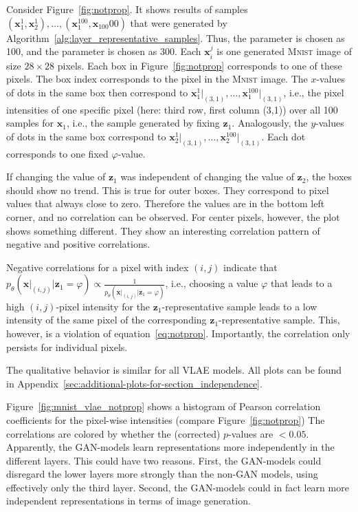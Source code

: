 Consider Figure~\ref{fig:notprop}.
It shows results of samples $(\bm{x}_1^1,\bm{x}_2^1),\dots,(\bm{x}_1^{100},\bm{x}_{100}00)$ that were generated by Algorithm~\ref{alg:layer_representative_samples}.
Thus, the parameter  is chosen as 100, and the parameter  is chosen as 300.
Each $\bm{x}_i^j$ is one generated \textsc{Mnist} image of size $28\times 28$ pixels.
Each box in Figure~\ref{fig:notprop} corresponds to one of these pixels.
The box index corresponds to the pixel in the \textsc{Mnist} image.
The $x$-values of dots in the same box then correspond to $\bm{x}_1^1\big|_{(3,1)}, \dots, \bm{x}_1^{100}\big|_{(3,1)}$, i.e., the pixel intensities of one specific pixel (here: third row, first column (3,1)) over all 100 samples for $\bm{x}_1$, i.e., the sample generated by fixing $\bm{z}_1$.
Analogously, the $y$-values of dots in the same box correspond to $\bm{x}_2^1\big|_{(3,1)}, \dots, \bm{x}_2^{100}\big|_{(3,1)}$.
Each dot corresponds to one fixed $\varphi$-value.

If changing the value of $\bm{z}_1$ was independent of changing the value of $\bm{z}_2$, the boxes should show no trend.
This is true for outer boxes.
They correspond to pixel values that always close to zero.
Therefore the values are in the bottom left corner, and no correlation can be observed.
For center pixels, however, the plot shows something different.
They show an interesting correlation pattern of negative and positive correlations.

Negative correlations for a pixel with index $(i,j)$ indicate that $p_\theta(\bm{x}\big|_{(i,j)} | \bm{z}_1 = \varphi) \propto \frac{1}{p_\theta(\bm{x}\big|_{(i,j)} | \bm{z}_1 = \varphi)}$, i.e., choosing a value $\varphi$ that leads to a high $(i,j)$-pixel intensity for the $\bm{z}_1$-representative sample leads to a low intensity of the same pixel of the corresponding $\bm{z}_1$-representative sample.
This, however, is a violation of equation~\ref{eq:notprop}.
Importantly, the correlation only persists for individual pixels.

The qualitative behavior is similar for all \ac{VLAE} models.
All plots can be found in Appendix~\ref{sec:additional-plots-for-section_independence}.

Figure~\ref{fig:mnist_vlae_notprop} shows a histogram of Pearson correlation coefficients for the pixel-wise intensities (compare Figure~\ref{fig:notprop})
The correlations are colored by whether the (corrected) $p$-values are $< 0.05$.
Apparently, the \ac{GAN}-models learn representations more independently in the different layers.
This could have two reasons.
First, the \ac{GAN}-models could disregard the lower layers more strongly than the non-\ac{GAN} models, using effectively only the third layer.
Second, the \ac{GAN}-models could in fact learn more independent representations in terms of image generation.

